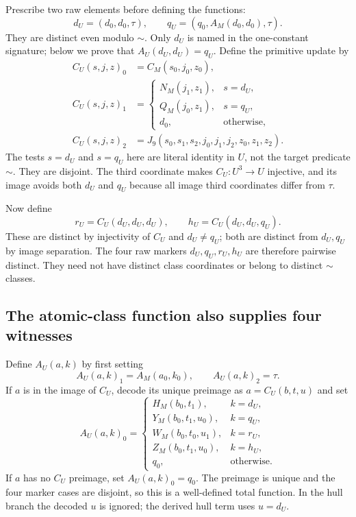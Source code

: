 Prescribe two raw elements before defining the functions:
\[
 d_U=(d_0,d_0,\tau),\qquad
 q_U=(q_0,A_M(d_0,d_0),\tau).
\]
They are distinct even modulo $\sim$.  Only $d_U$ is named in the
one-constant signature; below we prove that $A_U(d_U,d_U)=q_U$.
Define the primitive update by
\begin{align*}
 C_U(s,j,z)_0&=C_M(s_0,j_0,z_0),\\
 C_U(s,j,z)_1&=
 \begin{cases}
 N_M(j_1,z_1),&s=d_U,\\
 Q_M(j_0,z_1),&s=q_U,\\
 d_0,&\text{otherwise},
 \end{cases}\\
 C_U(s,j,z)_2&=
 J_9(s_0,s_1,s_2,j_0,j_1,j_2,z_0,z_1,z_2).
\end{align*}
The tests $s=d_U$ and $s=q_U$ here are literal identity in $U$, not
the target predicate $\sim$.  They are disjoint.  The third coordinate
makes $C_U:U^3\to U$ injective, and its image avoids both $d_U$ and
$q_U$ because all image third coordinates differ from $\tau$.

Now define
\[
 r_U=C_U(d_U,d_U,d_U),\qquad
 h_U=C_U(d_U,d_U,q_U).
\]
These are distinct by injectivity of $C_U$ and $d_U\ne q_U$; both are
distinct from $d_U,q_U$ by image separation.  The four raw markers
$d_U,q_U,r_U,h_U$ are therefore pairwise distinct.  They need not have
distinct class coordinates or belong to distinct $\sim$ classes.

\subsection{The atomic-class function also supplies four witnesses}

Define $A_U(a,k)$ by first setting
\[
 A_U(a,k)_1=A_M(a_0,k_0),\qquad A_U(a,k)_2=\tau.
\]
If $a$ is in the image of $C_U$, decode its unique preimage as
$a=C_U(b,t,u)$ and set
\[
 A_U(a,k)_0=
 \begin{cases}
 H_M(b_0,t_1),&k=d_U,\\
 Y_M(b_0,t_1,u_0),&k=q_U,\\
 W_M(b_0,t_0,u_1),&k=r_U,\\
 Z_M(b_0,t_1,u_0),&k=h_U,\\
 q_0,&\text{otherwise}.
 \end{cases}
\]
If $a$ has no $C_U$ preimage, set $A_U(a,k)_0=q_0$.
The preimage is unique and the four marker cases are disjoint, so this
is a well-defined total function.  In the hull branch the decoded $u$
is ignored; the derived hull term uses $u=d_U$.

